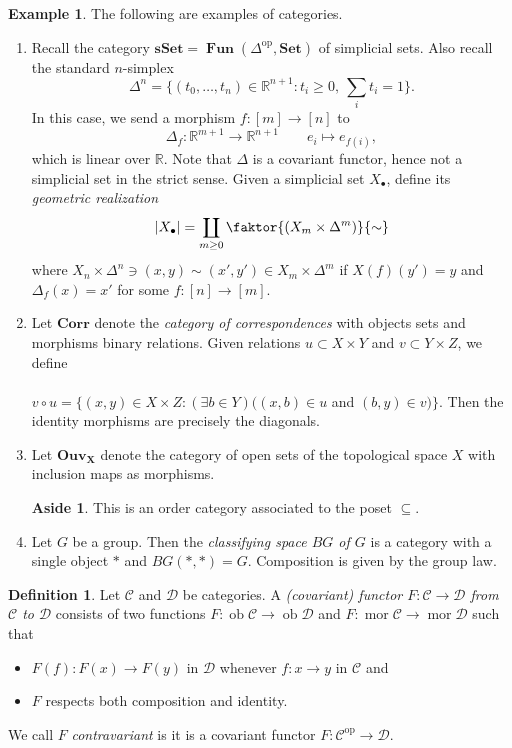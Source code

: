 \documentclass[10pt,letterpaper,cm]{nupset}
\theoremstyle{definition}
\newtheorem*{definition}{Definition}
\newtheorem{exmp}{Example}
\newtheorem*{aside}{Aside}
\newcommand{\R}{\mathbb R}
\newcommand{\1}{\mathbf{1}}
\renewcommand{\c}{\mathscr{C}}
\renewcommand{\d}{\mathscr{D}}
\newcommand{\0}{\vec 0}
\DeclareMathOperator{\op}{op}
\DeclareMathOperator{\mor}{mor}
\DeclareMathOperator{\ob}{ob}
\DeclareMathOperator{\Fun}{\mathbf{Fun}}
\begin{document}
\begin{exmp} The following are examples of categories.
\begin{enumerate}
\item Recall the category $\mathbf{sSet} = \Fun(\Delta^{\op}, \mathbf{Set})$ of simplicial sets. Also recall the standard $n$-simplex $$\Delta^n = \{(t_0, \ldots, t_n) \in \R^{n+1} : t_i \geq 0, \ \sum_i t_i =1\}.$$ In this case, we send a morphism $f : [m] \to [n]$ to $$\Delta_f : \R^{m+1} \to \R^{n+1} \quad \quad e_i \mapsto e_{f(i)},$$ which is linear over $\R$. Note that $\Delta$ is a covariant functor, hence not a simplicial set in the strict sense.
Given a simplicial set $X_{\bullet}$, define its \textit{geometric realization} $$|X_{\bullet}| = \coprod_{m\geq 0} \faktor{(X_m \times \Delta^m)}{\sim}$$ where $X_n \times \Delta^n \ni (x, y)\sim (x', y') \in X_m \times \Delta^m$ if $X(f)(y') = y$ and $\Delta_f(x) = x'$ for some $f: [n] \to [m]$.  
\item Let $\mathbf{Corr}$ denote the \textit{category of correspondences} with objects sets and morphisms binary relations. Given relations $u\subset X\times Y$ and $v \subset Y \times Z$, we define 
\\ \\ $v \circ u = \{(x, y) \in X \times Z : (\exists b \in Y)((x, b) \in u$ and $(b, y) \in v)\}.$ Then the identity morphisms are precisely the diagonals.
\item Let $\mathbf{Ouv_X}$ denote the category of open sets of the topological space $X$ with inclusion maps as morphisms. 
\begin{aside} This is an order category associated to the poset $\subseteq$. \end{aside}
\item Let $G$ be a group. Then the \textit{classifying space $BG$ of $G$} is a category with a single object $\ast$ and $BG(\ast, \ast) = G$. Composition is given by the group law.
\end{enumerate}
\end{exmp}

\begin{definition}
Let $\c$ and $\d$ be categories. A \textit{(covariant) functor $F: \c \to \d$ from $\c$ to $\d$} consists of two functions $F: \ob{\c} \to \ob{\d}$ and $F: \mor{\c} \to \mor{\d}$ such that 
\begin{itemize}
\item $F(f) : F(x) \to F(y)$ in $\d$ whenever $f: x \to y$ in $\c$ and
\item $F$ respects both composition and identity. 
\end{itemize}
We call $F$ \textit{contravariant} is it is a covariant functor $F: \c^{\op} \to \d$.
\end{definition}
\end{document}

